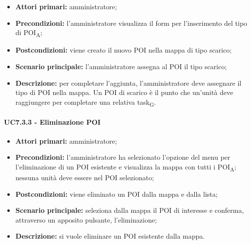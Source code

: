 \begin{itemize}

   \item   \textbf{Attori primari:} amministratore;

   \item   \textbf{Precondizioni:} l'amministratore visualizza il form per l'inserimento del tipo di POI\textsubscript{A};

   \item   \textbf{Postcondizioni:} viene creato il nuovo POI nella mappa di tipo scarico; 

   \item   \textbf{Scenario principale:} l'amministratore assegna al POI il tipo scarico;

  \item   \textbf{Descrizione:} per completare l'aggiunta, l'amministratore deve assegnare il tipo di POI nella mappa. Un POI di scarico è il punto che un'unità deve raggiungere per completare una relativa task\textsubscript{G}.



\end{itemize}





\paragraph{UC7.3.3 - Eliminazione POI}

\begin{itemize}

   \item   \textbf{Attori primari:} amministratore;

   \item   \textbf{Precondizioni:} l'amministratore ha selezionato l'opzione del menu per l'eliminazione di un POI esistente e visualizza la mappa con tutti i POI\textsubscript{A}; nessuna unità deve essere nel POI selezionato;

   \item   \textbf{Postcondizioni:} viene eliminato un POI dalla mappa e dalla lista; 

   \item   \textbf{Scenario principale:} seleziona dalla mappa il POI di interesse e conferma, attraverso un apposito pulsante, l'eliminazione;

   \item   \textbf{Descrizione:} si vuole eliminare un POI esistente dalla mappa.

\end{itemize}
